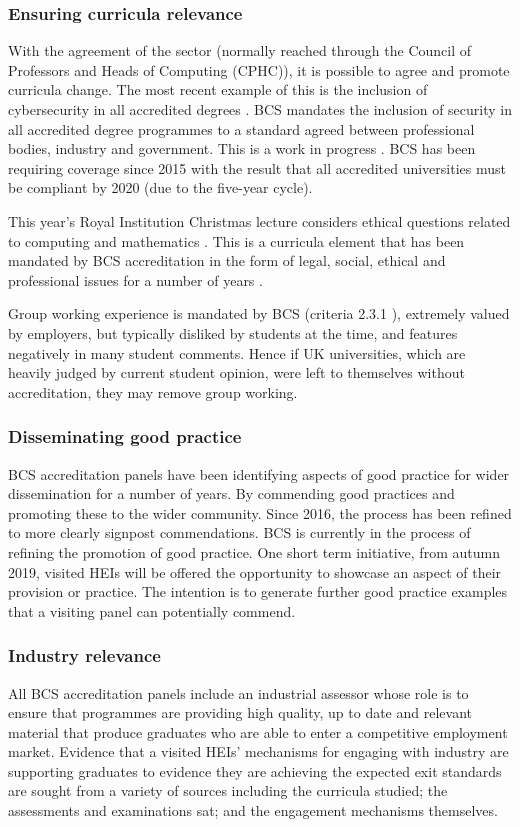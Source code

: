 \documentclass[sigconf]{acmart}
\begin{document}
\subsubsection{Ensuring curricula relevance}
With the agreement of the sector (normally reached through the Council of Professors and Heads of Computing (CPHC)), it is possible to agree and promote curricula change. The most recent example of this is the inclusion of cybersecurity in all accredited degrees \cite{Cricketal2019}. 
BCS mandates the inclusion of security in all accredited degree programmes to a standard agreed between professional bodies, industry and government. This is a work in progress \cite{Cricketal2019}. BCS has been requiring coverage since 2015 \cite[p.~17--18]{BCS2018a} with the result that all accredited universities must be compliant by 2020 (due to the five-year cycle). 

This year's Royal Institution Christmas lecture considers ethical questions related to computing and mathematics \cite{RoyalInstitution2019}. This is a curricula element that has been mandated by BCS accreditation in the form of legal, social, ethical and professional issues for a number of years \cite{Brooke2018}.

Group working experience is mandated by BCS (criteria 2.3.1 \cite [p31] {BCS2018a}), extremely valued by employers, but typically disliked by students at the time, and features negatively in many student comments. Hence if UK universities, which are heavily judged by current student opinion, were left to themselves without accreditation, they may remove group working.  

\subsubsection{Disseminating good practice}
BCS accreditation panels have been identifying aspects of good practice for wider dissemination for a number of years. By commending good practices and promoting these to the wider community. Since 2016, the process has been refined to more clearly signpost commendations. BCS is currently in the process of refining the promotion of good practice. One short term initiative, from autumn 2019, visited HEIs will be offered the opportunity to showcase an aspect of their provision or practice. The intention is to generate further good practice examples that a visiting panel can potentially commend.
\subsubsection{Industry relevance}
All BCS accreditation panels include an industrial assessor whose role is to ensure that programmes are providing high quality, up to date and relevant material that produce graduates who are able to enter a competitive employment market. Evidence that a visited HEIs' mechanisms for engaging with industry are supporting graduates to evidence they are achieving the expected exit standards are sought from a variety of sources including the curricula studied; the assessments and examinations sat; and the engagement mechanisms themselves. 
\end{document}
